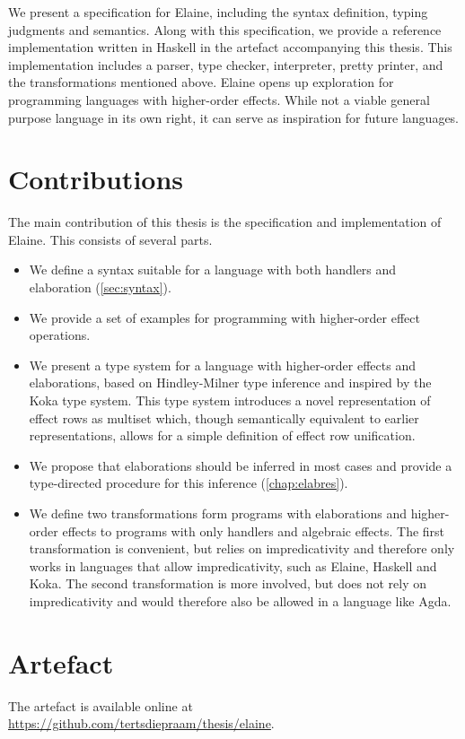 We present a specification for Elaine, including the syntax definition, typing judgments and semantics. Along with this specification, we provide a reference implementation written in Haskell in the artefact accompanying this thesis. This implementation includes a parser, type checker, interpreter, pretty printer, and the transformations mentioned above. Elaine opens up exploration for programming languages with higher-order effects. While not a viable general purpose language in its own right, it can serve as inspiration for future languages.


\section{Contributions}

The main contribution of this thesis is the specification and implementation of Elaine. This consists of several parts.

\begin{itemize}
    \item We define a syntax suitable for a language with both handlers and elaboration (\cref{sec:syntax}).
    \item We provide a set of examples for programming with higher-order effect operations.
    \item We present a type system for a language with higher-order effects and elaborations, based on Hindley-Milner type inference and inspired by the Koka type system. This type system introduces a novel representation of effect rows as multiset which, though semantically equivalent to earlier representations, allows for a simple definition of effect row unification.
    \item We propose that elaborations should be inferred in most cases and provide a type-directed procedure for this inference (\cref{chap:elabres}).
    \item We define two transformations form programs with elaborations and higher-order effects to programs with only handlers and algebraic effects. The first transformation is convenient, but relies on impredicativity and therefore only works in languages that allow impredicativity, such as Elaine, Haskell and Koka. The second transformation is more involved, but does not rely on impredicativity and would therefore also be allowed in a language like Agda.
\end{itemize}

\section{Artefact}\label{sec:artefact}


The artefact is available online at \url{https://github.com/tertsdiepraam/thesis/elaine}.
